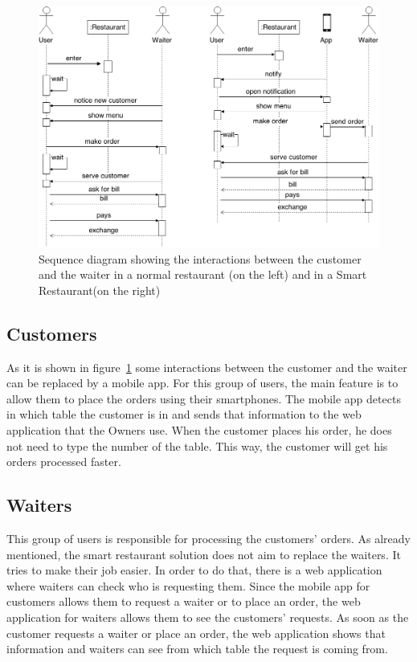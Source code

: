 \begin{figure}[!ht]
  \centering
    \includegraphics[width=1\textwidth]{figures/smart-restaurant}
    \caption{Sequence diagram showing the interactions between
    the customer and the waiter in a normal restaurant (on the left)
    and in a Smart Restaurant(on the right)}
    \label{fig:smart_restaurant}
\end{figure}

\subsection{Customers}
\label{sub:customers}
As it is shown in figure~\ref{fig:smart_restaurant} some interactions between
the customer and the waiter can be replaced by a mobile app.
For this group of users, the main feature is to allow them to place
the orders using their smartphones. The mobile app detects in which table
the customer is in and sends that information to the web application that the
Owners use. When the customer places his order, he does not need to type
the number of the table. This way, the customer will get his orders
processed faster.

\subsection{Waiters}
\label{sub:waiters}
This group of users is responsible for processing the customers' orders.
As already mentioned, the smart restaurant solution does not aim to replace
the waiters. It tries to make their job easier. In order to do that,
there is a web application where waiters can check who is requesting them.
Since the mobile app for customers allows them to request a waiter or to place
an order, the web application for waiters allows them to see the customers'
requests. As soon as the customer requests a waiter or place an order,
the web application shows that information and waiters can see from which
table the request is coming from.

